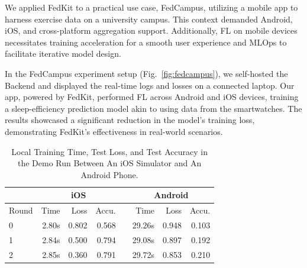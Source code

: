 \documentclass[conference]{IEEEtran}
\begin{document}
We applied FedKit to a practical use case, FedCampus,
utilizing a mobile app to harness exercise data on a university campus.
This context demanded Android, iOS, and cross-platform aggregation support.
Additionally,
FL on mobile devices necessitates training acceleration for
a smooth user experience
and MLOps to facilitate iterative model design.

In the FedCampus experiment setup (Fig.~\ref{fig:fedcampus}),
we self-hosted the Backend
and displayed the real-time logs and losses on a connected laptop.
Our app, powered by FedKit,
performed FL across Android and iOS devices,
training a sleep-efficiency prediction model
akin to \cite{khoa2022fedmcrnn}
using data from the smartwatches.
The results showcased a significant reduction in the model's training loss,
demonstrating FedKit's effectiveness in real-world scenarios.

\begin{table}
\centering
\small
\begin{tabular}{lrrrrrrr}
      &\multicolumn{3}{c}{iOS} & & \multicolumn{3}{c}{Android}\\
\hline
Round & Time   & Loss  & Accu. & & Time   & Loss  & Accu.     \\
\hline
0     &  2.80s & 0.802 & 0.568 & & 29.26s & 0.948 & 0.103     \\
1     &  2.84s & 0.500 & 0.794 & & 29.08s & 0.897 & 0.192     \\
2     &  2.85s & 0.360 & 0.791 & & 29.72s & 0.853 & 0.210     \\
\end{tabular}
\caption{Local Training Time, Test Loss, and Test Accuracy in the Demo Run Between An iOS Simulator and An Android Phone.}
\label{tbl:demo-stats}
\end{table}




\vspace{12pt}
\color{red}
\end{document}
